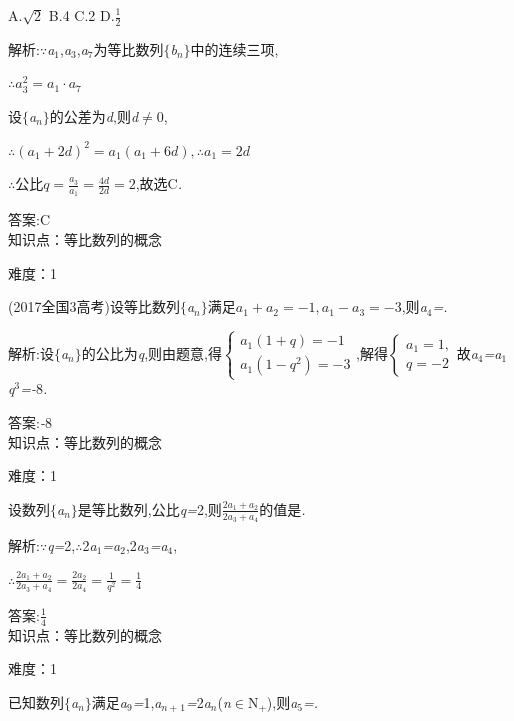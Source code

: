 \documentclass{article} %
\begin{document}
 A.$\sqrt{2}$ B.4 C.2 D.$\frac{1}{2}$

 解析:\textit{$\because$a}${}_{1}$,\textit{a}${}_{3}$,\textit{a}${}_{7}$为等比数列$\mathrm{\{}$\textit{b${}_{n}$}$\mathrm{\}}$中的连续三项,

$\therefore a_3^2=a_1\cdot a_7$

设$\mathrm{\{}$\textit{a${}_{n}$}$\mathrm{\}}$的公差为\textit{d},则\textit{d}$\mathrm{\neq}$0,

$\therefore (a_1+2d)^2=a_1(a_1+6d), \therefore a_1=2d$

\textit{$\therefore$}公比$q=\frac{a_3}{a_1}=\frac{4d}{2d}=2$,故选C\textit{.}

 答案:C \\

知识点：等比数列的概念

难度：1

 (2017全国3高考)设等比数列$\mathrm{\{}$\textit{a${}_{n}$}$\mathrm{\}}$满足$a_1+a_2=-1,a_1-a_3=-3$,则\textit{a}${}_{4}$\textit{=\underbar{　　　　　}.~}

 解析:设$\mathrm{\{}$\textit{a${}_{n}$}$\mathrm{\}}$的公比为\textit{q},则由题意,得$\left\{
\begin{array}{l}
a_1(1+q)=-1 \\
a_1(1-q^2)=-3
\end{array}
\right.$,解得$\left\{
\begin{array}{l}
a_1=1, \\
q=-2
\end{array}
\right.$故\textit{a}${}_{4}$\textit{=a}${}_{1}$\textit{q}${}^{3}$\textit{=-}8\textit{.}

 答案:\textit{-}8 \\

知识点：等比数列的概念

难度：1

 设数列$\mathrm{\{}$\textit{a${}_{n}$}$\mathrm{\}}$是等比数列,公比\textit{q=}2,则$\frac{2a_1+a_2}{2a_3+a_4}$的值是\textit{\underbar{　　　　　}.~}

 解析:\textit{$\because$q=}2,\textit{$\therefore$}2\textit{a}${}_{1}$\textit{=a}${}_{2}$,2\textit{a}${}_{3}$\textit{=a}${}_{4}$,

$\therefore \frac{2a_1+a_2}{2a_3+a_4}=\frac{2a_2}{2a_4}=\frac{1}{q^2}=\frac{1}{4}$

 答案:$\frac{1}{4}$ \\

知识点：等比数列的概念

难度：1

 已知数列$\mathrm{\{}$\textit{a${}_{n}$}$\mathrm{\}}$满足\textit{a}${}_{9}$\textit{=}1,\textit{a${}_{n+}$}${}_{1}$\textit{=}2\textit{a${}_{n}$}(\textit{n}$\mathrm{\in}$N\textit{${}_{+}$}),则\textit{a}${}_{5}$\textit{=\underbar{　　　　　}.~}
\end{document}

